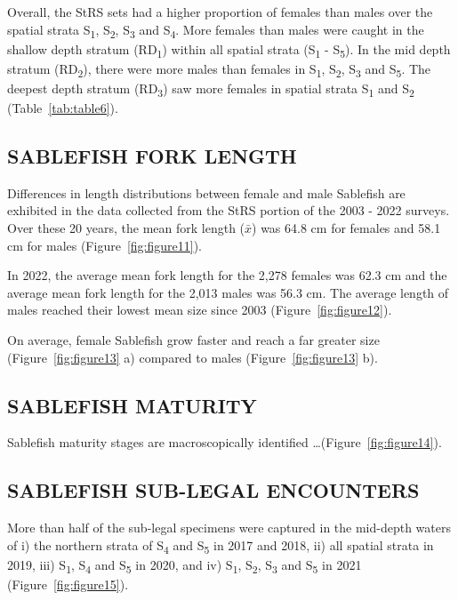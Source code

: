 \documentclass[12pt]{article}\usepackage[]{graphicx}\usepackage[]{color}
\begin{document}
Overall, the StRS sets had a higher proportion of females than males over the spatial strata S\textsubscript{1}, S\textsubscript{2}, S\textsubscript{3} and S\textsubscript{4}. More females than males were caught in the shallow depth stratum (RD\textsubscript{1}) within all spatial strata (S\textsubscript{1} - S\textsubscript{5}). In the mid depth stratum (RD\textsubscript{2}), there were more males than females in S\textsubscript{1}, S\textsubscript{2}, S\textsubscript{3} and S\textsubscript{5}. The deepest depth stratum (RD\textsubscript{3}) saw more females in spatial strata S\textsubscript{1} and S\textsubscript{2} (Table~\ref{tab:table6}).

\hypertarget{sablefish-fork-length}{%
\subsection{SABLEFISH FORK LENGTH}\label{sablefish-fork-length}}

Differences in length distributions between female and male Sablefish are exhibited in the data collected from the StRS portion of the 2003 - 2022 surveys. Over these 20 years, the mean fork length (\(\bar{x}\)) was 64.8 cm for females and 58.1 cm for males (Figure~\ref{fig:figure11}).

In 2022, the average mean fork length for the 2,278 females was 62.3 cm and the average mean fork length for the 2,013 males was 56.3 cm. The average length of males reached their lowest mean size since 2003 (Figure~\ref{fig:figure12}).

On average, female Sablefish grow faster and reach a far greater size (Figure~\ref{fig:figure13} a) compared to males (Figure~\ref{fig:figure13} b).

\hypertarget{sablefish-maturity}{%
\subsection{SABLEFISH MATURITY}\label{sablefish-maturity}}

Sablefish maturity stages are macroscopically identified \ldots(Figure~\ref{fig:figure14}).

\hypertarget{sablefish-sub-legal-encounters}{%
\subsection{SABLEFISH SUB-LEGAL ENCOUNTERS}\label{sablefish-sub-legal-encounters}}

More than half of the sub-legal specimens were captured in the mid-depth waters of i) the northern strata of S\textsubscript{4} and S\textsubscript{5} in 2017 and 2018, ii) all spatial strata in 2019, iii) S\textsubscript{1}, S\textsubscript{4} and S\textsubscript{5} in 2020, and iv) S\textsubscript{1}, S\textsubscript{2}, S\textsubscript{3} and S\textsubscript{5} in 2021 (Figure~\ref{fig:figure15}).
\end{document}
